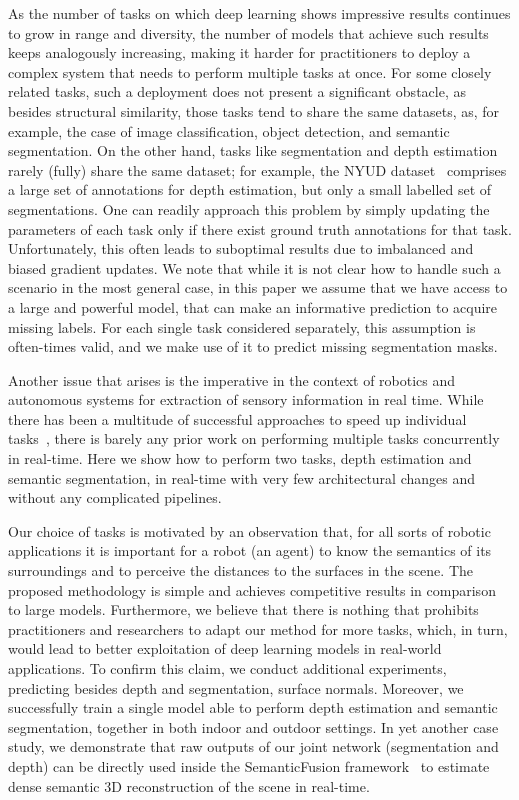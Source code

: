 \documentclass[letterpaper, 10 pt, conference]{ieeeconf}
\begin{document}
As the number of tasks on which deep learning shows impressive results continues to grow in range and diversity, the number of models that achieve such results keeps analogously increasing, making it harder for practitioners to deploy a complex system that needs to perform multiple tasks at once. For some closely related tasks, such a deployment does not present a significant obstacle, as besides structural similarity, those tasks tend to share the same datasets, as, for example, the case of image classification, object detection, and semantic segmentation. On the other hand, tasks like segmentation and depth estimation rarely (fully) share the same dataset;
for example, the NYUD dataset~\cite{SilbermanHKF12,GuptaAM13} comprises a large set of annotations for depth estimation, but only a small labelled set of segmentations. One can readily approach this problem by simply updating the parameters of each task only if there exist ground truth annotations for that task. Unfortunately, this often leads to suboptimal results due to imbalanced and biased gradient updates. We note that while it is not clear how to handle such a scenario in the most general case, in this paper we assume that we have access to a large and powerful model, that can make an informative prediction to acquire missing labels. For each single task considered separately, this assumption is often-times valid, and we make use of it to predict missing segmentation masks.

Another issue that arises is the imperative in the context of robotics and autonomous systems for extraction of sensory information in real time.
While there has been a multitude of successful approaches to speed up individual tasks~\cite{RenHG015,IandolaMAHDK16,ZhaoQSSJ17}, there is barely any prior work on performing multiple tasks concurrently in real-time. Here we show how to perform two tasks, depth estimation and semantic segmentation, in real-time with very few architectural changes and without any complicated pipelines.

Our choice of tasks is motivated by an observation that, for all sorts of robotic applications it is important for a robot (an agent) to know the semantics of its surroundings and to perceive the distances to the surfaces in the scene. The proposed methodology is simple and achieves competitive results in comparison to large models. Furthermore, we believe that there is nothing that prohibits practitioners and researchers to adapt our method for more tasks, which, in turn, would lead to better exploitation of deep learning models in real-world applications. To confirm this claim, we conduct additional experiments, predicting besides depth and segmentation, surface normals. Moreover, we successfully train a single model able to perform depth estimation and semantic segmentation, together in both indoor and outdoor settings. In yet another case study, we demonstrate that raw outputs of our joint network (segmentation and depth) can be directly used inside the SemanticFusion framework~\cite{McCormacHDL17} to estimate dense semantic $3$D reconstruction of the scene in real-time.
\end{document}
